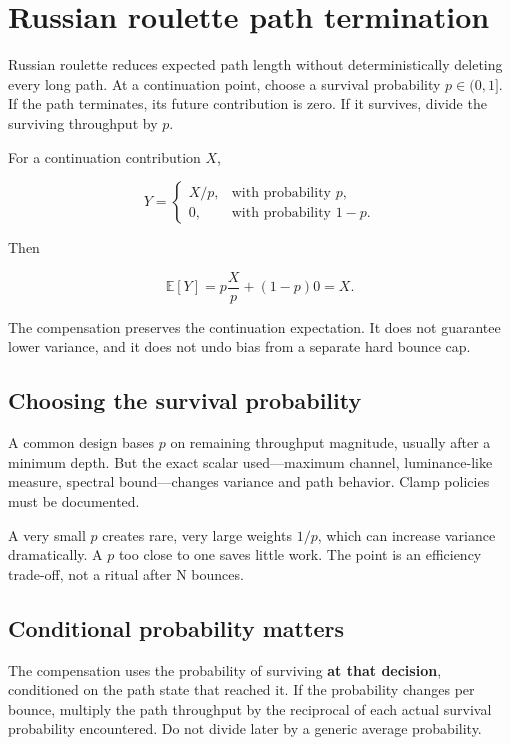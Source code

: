 \hypertarget{appendix-7277c62d4599}{}\label{referencestart:appendix-7277c62d4599}
\section{Russian roulette path termination}\label{appendix-7277c62d4599-russian-roulette-path-termination}

Russian roulette reduces expected path length without deterministically deleting every long path. At a continuation point, choose a survival probability \(p\in(0,1]\). If the path terminates, its future contribution is zero. If it survives, divide the surviving throughput by \(p\).

For a continuation contribution \(X\),

\[
Y=
\begin{cases}
X/p,&\text{with probability }p,\\
0,&\text{with probability }1-p.
\end{cases}
\]

Then

\[
\mathbb E[Y]
=
p\frac{X}{p}+(1-p)0
=
X.
\]

The compensation preserves the continuation expectation. It does not guarantee lower variance, and it does not undo bias from a separate hard bounce cap.

\subsection{Choosing the survival probability}\label{appendix-7277c62d4599-choosing-the-survival-probability}

A common design bases \(p\) on remaining throughput magnitude, usually after a minimum depth. But the exact scalar used---maximum channel, luminance-like measure, spectral bound---changes variance and path behavior. Clamp policies must be documented.

A very small \(p\) creates rare, very large weights \(1/p\), which can increase variance dramatically. A \(p\) too close to one saves little work. The point is an efficiency trade-off, not a ritual after N bounces.

\subsection{Conditional probability matters}\label{appendix-7277c62d4599-conditional-probability-matters}

The compensation uses the probability of surviving \textbf{at that decision}, conditioned on the path state that reached it. If the probability changes per bounce, multiply the path throughput by the reciprocal of each actual survival probability encountered. Do not divide later by a generic average probability.

